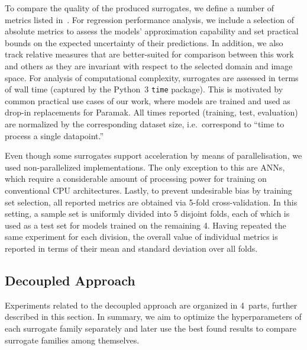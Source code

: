 To compare the quality of the produced surrogates, we define a number of metrics listed
in~. For regression performance analysis, we include a
selection of absolute metrics to assess the models' approximation capability and set
practical bounds on the expected uncertainty of their predictions. In addition, we also track
relative measures that are better-suited for comparison between this work and others as
they are invariant with respect to the selected domain and image space.
For analysis of computational complexity, surrogates are assessed in terms of wall
time (captured by the Python~3 \texttt{time} package). This is motivated by common practical use
cases of our work, where models are trained and used as drop-in replacements for
Paramak. All times reported (training, test, evaluation) are
normalized by the corresponding dataset size, i.e.~correspond to ``time to
process a single datapoint.''

Even though some surrogates support acceleration by means of parallelisation, we
used non-parallelized implementations. The only exception to this are ANNs,
which require a considerable amount of processing power for training on
conventional CPU architectures. Lastly, to prevent undesirable bias by training
set selection, all reported metrics are obtained via 5-fold cross-validation.
In this setting, a sample set is uniformly divided into 5 disjoint folds, each of which
is used as a test set for models trained on the remaining 4. Having repeated the
same experiment for each division, the overall value of individual metrics is
reported in terms of their mean and standard deviation over all folds.



\subsection{Decoupled Approach}\label{sec:experiment-methodology}

Experiments related to the decoupled approach are organized in 4~parts,
further described in this section. In summary, we aim to optimize the hyperparameters of
each surrogate family separately and later use the best found results to compare surrogate
families among themselves.

